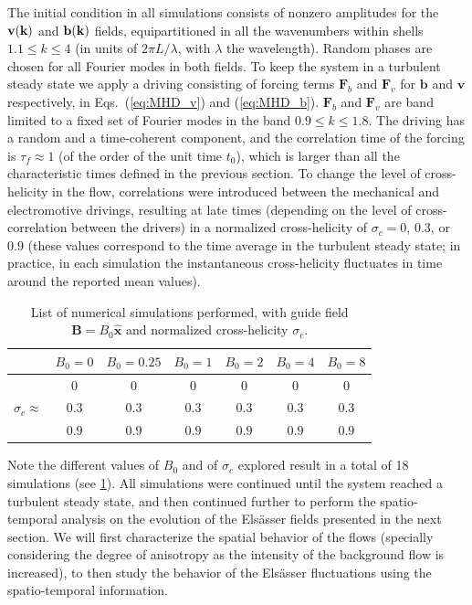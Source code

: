 \documentclass[aip,pop,reprint,amsmath,amssymb,floatfix]{revtex4-1}
\let\oldhat\hat
\renewcommand{\vec}[1]{\mathbf{#1}}
\renewcommand{\hat}[1]{\oldhat{\mathbf{#1}}}
\begin{document}
The initial condition in all simulations consists of nonzero
amplitudes for the ${\bf v}({\bf k})$ and ${\bf b}({\bf k})$ fields,
equipartitioned in all the wavenumbers within shells $1.1 \leq k \leq
4$ (in units of $2\pi L/\lambda$, with $\lambda$ the
wavelength). Random phases are chosen for all Fourier modes in both
fields. To keep the system in a turbulent steady state we apply a
driving consisting of forcing terms $\vec{F}_b$ and $\vec{F}_v$ for
$\vec{b}$ and $\vec{v}$ respectively, in Eqs.~(\ref{eq:MHD_v}) and
(\ref{eq:MHD_b}). $\vec{F}_b$ and $\vec{F}_v$ are band limited to a
fixed set of Fourier modes in the band $0.9\leq k \leq 1.8$. The
driving has a random and a time-coherent component, and the
correlation time of the forcing is $\tau_f \approx 1$ (of the order of
the unit time $t_0$), which is larger than all the characteristic
times defined in the previous section. To change the level of
cross-helicity in the flow, correlations were introduced between the
mechanical and electromotive drivings, resulting at late times
(depending on the level of cross-correlation between the drivers) in a
normalized cross-helicity of $\sigma_c=0$, $0.3$, or $0.9$ (these
values correspond to the time average in the turbulent steady state;
in practice, in each simulation the instantaneous cross-helicity
fluctuates in time around the reported mean values).

\begin{table}
\begin{tabular}{|l||c||c||c||c||c||c|}
\hline
        & $B_0=0$ & $B_0 = 0.25$ & $B_0 = 1$ & $B_0 = 2$ & $B_0 = 4$ & $B_0 = 8$ \\ \hline\hline
              & $0$ & $0$ & $0$ & $0$ & $0$ & $0$ \\ \cline{2-7} 
$\sigma_c \approx $ & $0.3$ & $0.3$ & $0.3$ & $0.3$ & $0.3$ & $0.3$ \\ \cline{2-7} 
              & $0.9$ & $0.9$ & $0.9$ & $0.9$ & $0.9$ & $0.9$ \\ \hline
\end{tabular}
\caption{List of numerical simulations performed, with guide field
$\vec{B} = B_0 \hat{x}$ and normalized cross-helicity $\sigma_c$.}
\label{tab:listSim}
\end{table}

Note the different values of $B_0$ and of $\sigma_c$ explored result
in a total of 18 simulations (see \cref{tab:listSim}). All simulations
were continued until the system reached a turbulent steady state, and
then continued further to perform the spatio-temporal analysis on the
evolution of the Els\"asser fields presented in the next section. We
will first characterize the spatial behavior of the flows (specially
considering the degree of anisotropy as the intensity of the
background flow is increased), to then study the behavior of the
Els\"asser fluctuations using the spatio-temporal information.
\end{document}
